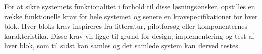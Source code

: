For at sikre systemets funktionalitet i forhold til disse løsningsønsker, opstilles en række funktionelle krav for hele systemet og senere en kravspecifikationer for hver blok. Hver bloks krav inspireres fra litteratur, pilotforsøg eller komponenternes karakteristika. Disse krav vil ligge til grund for design, implementering og test af hver blok, som til sidst kan samles og det samlede system kan derved testes.